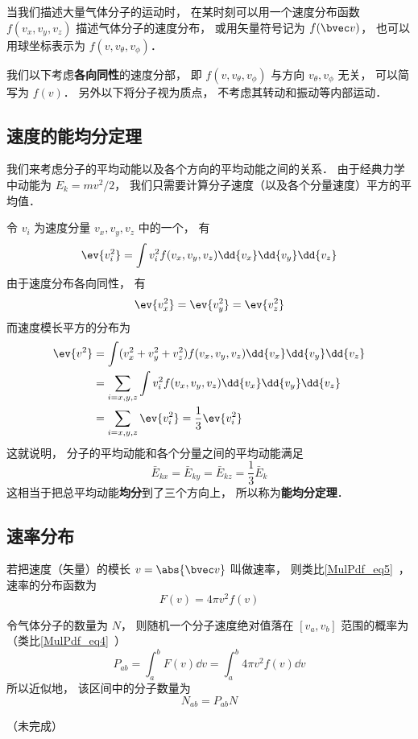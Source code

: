 
\begin{issues}
\issueTODO
\end{issues}

当我们描述大量气体分子的运动时， 在某时刻可以用一个速度分布函数 $f(v_x, v_y, v_z)$ 描述气体分子的速度分布， 或用矢量符号记为 $f(\bvec v)$， 也可以用球坐标表示为 $f(v, v_\theta, v_\phi)$．

我们以下考虑\textbf{各向同性}的速度分部， 即 $f(v, v_\theta, v_\phi)$ 与方向 $v_\theta, v_\phi$ 无关， 可以简写为 $f(v)$． 另外以下将分子视为质点， 不考虑其转动和振动等内部运动．

\subsection{速度的能均分定理}
我们来考虑分子的平均动能以及各个方向的平均动能之间的关系． 由于经典力学中动能为 $E_k = mv^2/2$， 我们只需要计算分子速度（以及各个分量速度）平方的平均值．

令 $v_i$ 为速度分量 $v_x, v_y, v_z$ 中的一个， 有
\begin{equation}
\ev{v_i^2} = \int v_i^2 f(v_x, v_y, v_z) \dd{v_x}\dd{v_y}\dd{v_z}
\end{equation}
由于速度分布各向同性， 有
\begin{equation}
\ev{v_x^2} = \ev{v_y^2} = \ev{v_z^2}
\end{equation}
而速度模长平方的分布为
\begin{equation}
\begin{aligned}
\ev{v^2} &= \int (v_x^2 + v_y^2 + v_z^2) f(v_x, v_y, v_z) \dd{v_x}\dd{v_y}\dd{v_z}\\
&= \sum_{i = x,y,z} \int v_i^2 f(v_x, v_y, v_z) \dd{v_x}\dd{v_y}\dd{v_z}\\
&= \sum_{i = x,y,z} \ev{v_i^2} = \frac{1}{3} \ev{v_i^2}
\end{aligned}
\end{equation}
这就说明， 分子的平均动能和各个分量之间的平均动能满足
\begin{equation}
\bar E_{kx} = \bar E_{ky} = \bar E_{kz} = \frac{1}{3} \bar E_k
\end{equation}
这相当于把总平均动能\textbf{均分}到了三个方向上， 所以称为\textbf{能均分定理}．

\subsection{速率分布}
若把速度（矢量）的模长 $v = \abs{\bvec v}$ 叫做速率， 则类比\autoref{MulPdf_eq5}~， 速率的分布函数为
\begin{equation}
F(v) = 4\pi v^2 f(v)
\end{equation}

令气体分子的数量为 $N$， 则随机一个分子速度绝对值落在 $[v_a, v_b]$ 范围的概率为（类比\autoref{MulPdf_eq4}~）
\begin{equation}
P_{ab} = \int_a^b F(v) \dd{v} = \int_a^b 4\pi v^2 f(v) \dd{v}
\end{equation}
所以近似地， 该区间中的分子数量为
\begin{equation}
N_{ab} = P_{ab} N
\end{equation}

（未完成）